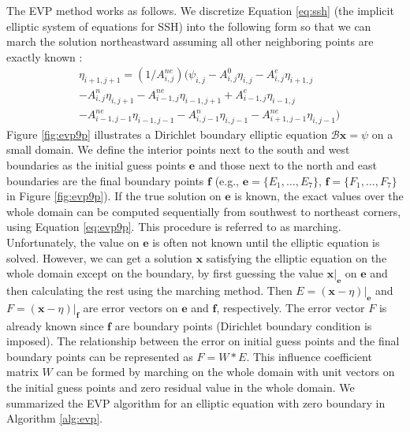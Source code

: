 The EVP method works as follows. We discretize Equation \ref{eq:ssh}
(the implicit elliptic system of equations for SSH)
into the following form so that we can march the solution northeastward assuming all other neighboring points are exactly known :
\begin{eqnarray}
\label{eq:evp9p}
&\eta_{i+1,j+1} = (1/A_{i,j}^{ne} )(\psi_{i,j} - A_{i,j}^0\eta_{i,j}-A_{i,j}^e\eta_{i+1,j} \nonumber\\
&-A_{i,j}^n\eta_{i,j+1}-A_{i-1,j}^{ne}\eta_{i-1,j+1} +A_{i-1,j}^e\eta_{i-1,j}\nonumber\\
&-A_{i-1,j-1}^{ne}\eta_{i-1,j-1}-A_{i,j-1}^n\eta_{i,j-1}- A_{i+1,j-1}^{ne}\eta_{i,j-1} )
\end{eqnarray}
Figure \ref{fig:evp9p} illustrates a Dirichlet boundary
elliptic equation $\mathcal{B}\textbf{x} = \psi$ on a small domain.  We
define the interior points next to the south and west boundaries as
the initial guess points $\textbf{e}$ and those next to the north and
east boundaries are the final boundary points $\textbf{f}$ (e.g.,
$\textbf{e}= \{E_1, \dots, E_7\}$, $\textbf{f}= \{F_1, \dots, F_7\}$
in Figure \ref{fig:evp9p}).  If the true solution on $\textbf{e}$ is
known, the exact values over the whole domain can be computed
sequentially from southwest to northeast corners, using Equation
\ref{eq:evp9p}. This procedure is referred to as marching.
Unfortunately, the value on $\textbf{e}$ is often not known until the
elliptic equation is solved.  However, we can get a solution
$\textbf{x}$ satisfying the elliptic equation on the whole domain
except on the boundary, by first guessing the value
$\textbf{x}|_\textbf{e}$ on $\textbf{e}$ and then calculating the rest
using the marching method.  Then $E=(\textbf{x} -\eta)|_\textbf{e}$
and $F=(\textbf{x} -\eta)|_\textbf{f}$ are error vectors on
$\textbf{e}$ and $\textbf{f}$, respectively.  The error vector $F$ is
already known since $\textbf{f}$ are boundary points (Dirichlet
boundary condition is imposed).  The relationship between the error on
initial guess points and the final boundary points can be represented
as $F=W*E$.  This influence coefficient matrix $W$ can be formed by
marching on the whole domain with unit vectors on the initial guess
points and zero residual value in the whole domain.  We summarized
the EVP algorithm for an elliptic equation with zero boundary in
Algorithm \ref{alg:evp}.


